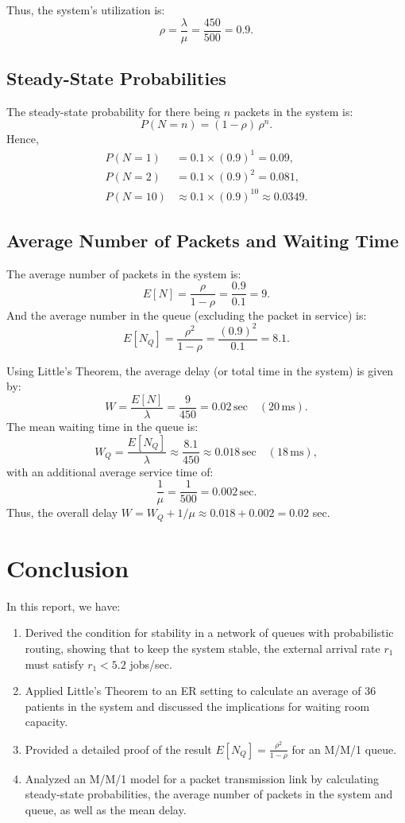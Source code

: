 \documentclass[12pt]{article}
\begin{document}
Thus, the system's utilization is:
\[
\rho = \frac{\lambda}{\mu} = \frac{450}{500} = 0.9.
\]

\subsection*{Steady-State Probabilities}
The steady-state probability for there being \(n\) packets in the system is:
\[
P(N = n) = (1-\rho)\,\rho^n.
\]
Hence,
\begin{align*}
P(N = 1) &= 0.1 \times (0.9)^1 = 0.09,\\[1mm]
P(N = 2) &= 0.1 \times (0.9)^2 = 0.081,\\[1mm]
P(N = 10) &\approx 0.1 \times (0.9)^{10} \approx 0.0349.
\end{align*}

\subsection*{Average Number of Packets and Waiting Time}
The average number of packets in the system is:
\[
E[N] = \frac{\rho}{1-\rho} = \frac{0.9}{0.1} = 9.
\]
And the average number in the queue (excluding the packet in service) is:
\[
E[N_Q] = \frac{\rho^2}{1-\rho} = \frac{(0.9)^2}{0.1} = 8.1.
\]

Using Little’s Theorem, the average delay (or total time in the system) is given by:
\[
W = \frac{E[N]}{\lambda} = \frac{9}{450} = 0.02\,\text{sec} \quad (20\,\text{ms}).
\]
The mean waiting time in the queue is:
\[
W_Q = \frac{E[N_Q]}{\lambda} \approx \frac{8.1}{450} \approx 0.018\,\text{sec} \quad (18\,\text{ms}),
\]
with an additional average service time of:
\[
\frac{1}{\mu} = \frac{1}{500} = 0.002\,\text{sec}.
\]
Thus, the overall delay \(W = W_Q + 1/\mu \approx 0.018 + 0.002 = 0.02\) sec.

\section{Conclusion}

In this report, we have:
\begin{enumerate}
    \item Derived the condition for stability in a network of queues with probabilistic routing, showing that to keep the system stable, the external arrival rate \(r_1\) must satisfy \(r_1 < 5.2\) jobs/sec.
    \item Applied Little's Theorem to an ER setting to calculate an average of 36 patients in the system and discussed the implications for waiting room capacity.
    \item Provided a detailed proof of the result \(E[N_Q]=\frac{\rho^2}{1-\rho}\) for an M/M/1 queue.
    \item Analyzed an M/M/1 model for a packet transmission link by calculating steady-state probabilities, the average number of packets in the system and queue, as well as the mean delay.
\end{enumerate}
\end{document}
